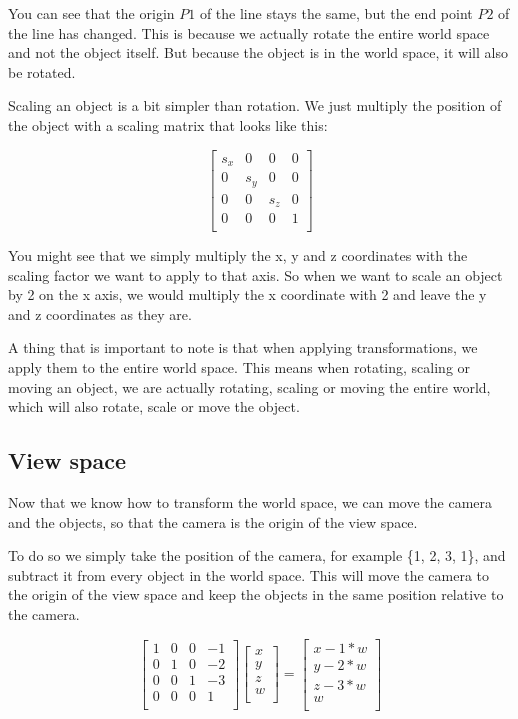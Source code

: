 \documentclass[12pt]{report} \usepackage{preamble}
\begin{document}
You can see that the origin \(P1\) of the line stays the same, but the end point \(P2\)
of the line has changed. This is because we actually rotate the entire
world space and not the object itself. But because the object is in the
world space, it will also be rotated.

Scaling an object is a bit simpler than rotation. We just multiply
the position of the object with a scaling matrix that
looks like this:

\[
	\begin{bmatrix}
		s_x & 0   & 0   & 0 \\
		0   & s_y & 0   & 0 \\
		0   & 0   & s_z & 0 \\
		0   & 0   & 0   & 1 \\
	\end{bmatrix}
\]

You might see that we simply multiply the x, y and z coordinates with the
scaling factor we want to apply to that axis. So when we want to scale an
object by 2 on the x axis, we would multiply the x coordinate with 2 and
leave the y and z coordinates as they are.

A thing that is important to note is that when applying transformations,
we apply them to the entire world space. This means when rotating, scaling or
moving an object, we are actually rotating, scaling or moving the entire world,
which will also rotate, scale or move the object.

\subsection{View space}

Now that we know how to transform the world space, we can move the camera
and the objects, so that the camera is the origin of the view space.

To do so we simply take the position of the camera, for example \{1, 2, 3, 1\},
and subtract it from every object in the world space. This will move the
camera to the origin of the view space and keep the objects in the same
position relative to the camera.

\[
	\begin{bmatrix}
		1 & 0 & 0 & -1 \\
		0 & 1 & 0 & -2 \\
		0 & 0 & 1 & -3 \\
		0 & 0 & 0 & 1  \\
	\end{bmatrix}
	\begin{bmatrix}
		x \\
		y \\
		z \\
		w \\
	\end{bmatrix}
	=
	\begin{bmatrix}
		x - 1*w \\
		y - 2*w \\
		z - 3*w \\
		w       \\
	\end{bmatrix}
\]
\end{document}
